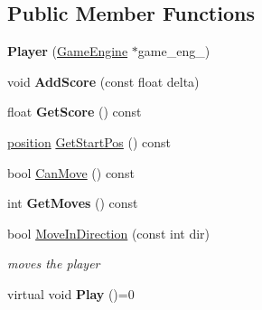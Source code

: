 \subsection*{Public Member Functions}
\begin{DoxyCompactItemize}
\item 
{\bfseries Player} (\hyperlink{class_game_engine}{Game\+Engine} $\ast$game\+\_\+eng\+\_\+)\hypertarget{class_player_aecff22f81d0d3093d42be398456bbe62}{}\label{class_player_aecff22f81d0d3093d42be398456bbe62}

\item 
void {\bfseries Add\+Score} (const float delta)\hypertarget{class_player_a3e473c9e5749501cc42dbdae5b77d0f2}{}\label{class_player_a3e473c9e5749501cc42dbdae5b77d0f2}

\item 
float {\bfseries Get\+Score} () const \hypertarget{class_player_ac8d63e7ecc7b640d6710462bbc5715d4}{}\label{class_player_ac8d63e7ecc7b640d6710462bbc5715d4}

\item 
\hyperlink{structposition}{position} \hyperlink{class_player_a15005501b35a90791448552245581060}{Get\+Start\+Pos} () const 
\item 
bool \hyperlink{class_player_a68f6b86fc2420f0ee45024e44929ba15}{Can\+Move} () const 
\item 
int {\bfseries Get\+Moves} () const \hypertarget{class_player_a4a9f3ee2deff72685459f606fe640c1d}{}\label{class_player_a4a9f3ee2deff72685459f606fe640c1d}

\item 
bool \hyperlink{class_player_af92895e18f19034043f8274a069afde6}{Move\+In\+Direction} (const int dir)
\begin{DoxyCompactList}\small\item\em moves the player \end{DoxyCompactList}\item 
virtual void {\bfseries Play} ()=0\hypertarget{class_player_aeef5c9637e474dd73ea27e9ffc583dcd}{}\label{class_player_aeef5c9637e474dd73ea27e9ffc583dcd}

\end{DoxyCompactItemize}
